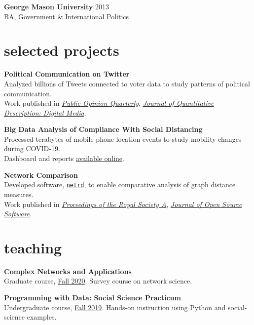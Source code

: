 \documentclass[11pt, letter]{article}
\begin{document}
\textbf{George Mason University}  \hfill 2013 \\
BA, Government \& International Politics \\

\vspace{2mm}

\section{selected projects}

\textbf{Political Communication on Twitter} \\
Analyzed billions of Tweets connected to voter data to study patterns of political communication. \\
Work published in \href{https://academic.oup.com/poq/article/85/S1/323/6342443?guestAccessKey=3c4778c7-e064-4647-b223-6caa3ab9e002}{\emph{Public Opinion Quarterly}}, \href{https://journalqd.org/article/view/2570}{\emph{Journal of Quantitative Description: Digital Media}}.

\vspace{3mm}
\textbf{Big Data Analysis of Compliance With Social Distancing}\\
Processed terabytes of mobile-phone location events to study mobility changes during COVID-19. \\
Dashboard and reports \href{https://covid19.gleamproject.org/mobility}{available online}.

\vspace{3mm}
\textbf{Network Comparison} \\
Developed software, \href{https://github.com/netsiphd/netrd}{\texttt{netrd}}, to enable comparative analysis of graph distance measures. \\
Work published in \href{https://royalsocietypublishing.org/doi/10.1098/rspa.2019.0744}{\emph{Proceedings of the Royal Society A}}, \href{https://joss.theoj.org/papers/10.21105/joss.02990}{\emph{Journal of Open Source Software}}.

\section{teaching}
\textbf{Complex Networks and Applications} \\
Graduate course, \href{https://web.archive.org/web/20210102223738/barabasilab.com/course}{Fall 2020}. Survey course on network science.
\vspace{3mm}

\textbf{Programming with Data: Social Science Practicum} \\
Undergraduate course, \href{https://sdmccabe.github.io/ds2001/}{Fall 2019}. Hands-on instruction using Python and social-science examples.
\end{document}
